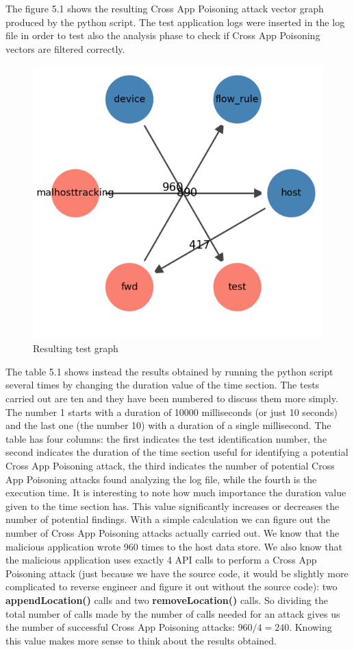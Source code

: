 The figure 5.1 shows the resulting Cross App Poisoning attack vector graph produced by the python script. The test application logs were inserted in the log file in order to test also the analysis phase to check if Cross App Poisoning vectors are filtered correctly.
\begin{figure}[h]
\caption{Resulting test graph}
\label{fig:graphtest}
\includegraphics[width=1.0\textwidth]{resources/Chapter-5/graph1.png}
\centering
\end{figure}
The table 5.1 shows instead the results obtained by running the python script several times by changing the duration value of the time section. The tests carried out are ten and they have been numbered to discuss them more simply. The number 1 starts with a duration of 10000 milliseconds (or just 10 seconds) and the last one (the number 10) with a duration of a single millisecond. The table has four columns: the first indicates the test identification number, the second indicates the duration of the time section useful for identifying a potential Cross App Poisoning attack, the third indicates the number of potential Cross App Poisoning attacks found analyzing the log file, while the fourth is the execution time. It is interesting to note how much importance the duration value given to the time section has. This value significantly increases or decreases the number of potential findings. With a simple calculation we can figure out the number of Cross App Poisoning attacks actually carried out. We know that the malicious application wrote 960 times to the host data store. We also know that the malicious application uses exactly 4 API calls to perform a Cross App Poisoning attack (just because we have the source code, it would be slightly more complicated to reverse engineer and figure it out without the source code): two \textbf{appendLocation()} calls and two \textbf{removeLocation()} calls. So dividing the total number of calls made by the number of calls needed for an attack gives us the number of successful Cross App Poisoning attacks: $960 / 4 = 240$. Knowing this value makes more sense to think about the results obtained.
